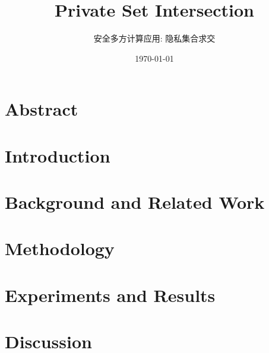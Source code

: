 \documentclass[lang=cn,10pt]{elegantbook}
\title{Private Set Intersection}
\subtitle{安全多方计算应用: 隐私集合求交}
\author{\MyFont{牛午甲 \& 潘云石 \& 石磊鑫 \& 孙霄鹍 \& 陈昊}}
\institute{USTC}
\date{\today}
\begin{document}
\maketitle
\frontmatter

\tableofcontents

\mainmatter

\chapter{Abstract}


\chapter{Introduction}


\chapter{Background and Related Work}


\chapter{Methodology}\label{chap:method}


\chapter{Experiments and Results}


\chapter{Discussion}




\printbibliography[title=\ebibname]
\end{document}
